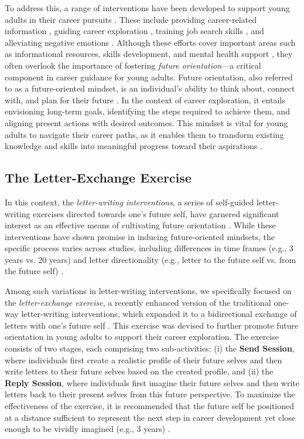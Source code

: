 To address this, a range of interventions have been developed to support young adults in their career pursuits \cite{soares2022systematic}. These include providing career-related information \cite{teychenne2019pre,lam2018impact}, guiding career exploration \cite{kepir2020effectiveness, pordelan2018online}, training job search skills \cite{chukwuedo2022practitioners}, and alleviating negative emotions \cite{ogbuanya2018effect}. Although these efforts cover important areas such as informational resources, skills development, and mental health support \cite{soares2022systematic}, they often overlook the importance of fostering \textit{future orientation}—a critical component in career guidance for young adults. Future orientation, also referred to as a future-oriented mindset, is an individual's ability to think about, connect with, and plan for their future \cite{chishima2021conversation}. In the context of career exploration, it entails envisioning long-term goals, identifying the steps required to achieve them, and aligning present actions with desired outcomes. This mindset is vital for young adults to navigate their career paths, as it enables them to transform existing knowledge and skills into meaningful progress toward their aspirations \cite{oyserman2023possible, kao2022see, guan2017modeling, strauss2012future}.

\subsection{The Letter-Exchange Exercise}
In this context, the \textit{letter-writing interventions}, a series of self-guided letter-writing exercises directed towards one's future self, have garnered significant interest as an effective means of cultivating future orientation \cite{barnett2019influence, rutchick2018future, van2013vividness}. While these interventions have shown promise in inducing future-oriented mindsets, the specific process varies across studies, including differences in time frames (e.g., 3 years vs. 20 years) and letter directionality (e.g., letter to the future self vs. from the future self) \cite{barnett2019influence}. 

Among such variations in letter-writing interventions, we specifically focused on the \textit{letter-exchange exercise}, a recently enhanced version of the traditional one-way letter-writing interventions, which expanded it to a bidirectional exchange of letters with one's future self \cite{chishima2021conversation}. This exercise was devised to further promote future orientation in young adults to support their career exploration. The exercise consists of two stages, each comprising two sub-activities: (i) the \textbf{Send Session}, where individuals first create a realistic profile of their future selves and then write letters to their future selves based on the created profile, and (ii) the \textbf{Reply Session}, where individuals first imagine their future selves and then write letters back to their present selves from this future perspective. To maximize the effectiveness of the exercise, it is recommended that the future self be positioned at a distance sufficient to represent the next step in career development yet close enough to be vividly imagined (e.g., 3 years) \cite{chishima2021conversation}.

